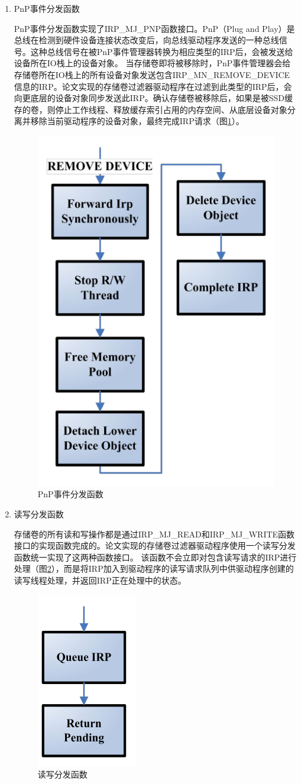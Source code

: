 \begin{enumerate}
\item PnP事件分发函数

PnP事件分发函数实现了IRP\_MJ\_PNP函数接口。PnP（Plug and Play）是总线在检测到硬件设备连接状态改变后，向总线驱动程序发送的一种总线信号。这种总线信号在被PnP事件管理器转换为相应类型的IRP后，会被发送给设备所在IO栈上的设备对象。
当存储卷即将被移除时，PnP事件管理器会给存储卷所在IO栈上的所有设备对象发送包含IRP\_MN\_REMOVE\_DEVICE信息的IRP。论文实现的存储卷过滤器驱动程序在过滤到此类型的IRP后，会向更底层的设备对象同步发送此IRP。确认存储卷被移除后，如果是被SSD缓存的卷，则停止工作线程、释放缓存索引占用的内存空间、从底层设备对象分离并移除当前驱动程序的设备对象，最终完成IRP请求（图\ref{fig:df-pnp}）。

\begin{figure}[htb]
\centering
\includegraphics[width=0.4\linewidth]{./graph/df-pnp}
\caption{PnP事件分发函数}
\label{fig:df-pnp}
\end{figure}

\item 读写分发函数

存储卷的所有读和写操作都是通过IRP\_MJ\_READ和IRP\_MJ\_WRITE函数接口的实现函数完成的。论文实现的存储卷过滤器驱动程序使用一个读写分发函数统一实现了这两种函数接口。
该函数不会立即对包含读写请求的IRP进行处理（图\ref{fig:df-rw}），而是将IRP加入到驱动程序的读写请求队列中供驱动程序创建的读写线程处理，并返回IRP正在处理中的状态。

\begin{figure}[htb]
\centering
\includegraphics[width=0.2\linewidth]{./graph/df-rw}
\caption{读写分发函数}
\label{fig:df-rw}
\end{figure}


\end{enumerate}
